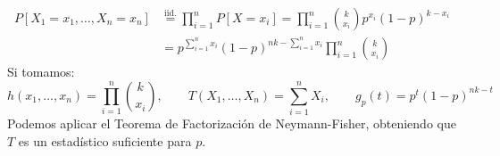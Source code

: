 \begin{ejercicio}
\begin{enumerate}[label=\alph*)]
            \begin{align*}
                P[X_1=x_1, \ldots, X_n = x_n] &\stackrel{\text{iid.}}{=} \prod_{i=1}^{n} P[X=x_i] = \prod_{i=1}^{n} \binom{k}{x_i} p^{x_i} {(1-p)}^{k-x_i} \\
                                              &= p^{\sum\limits_{i=1}^n x_i} {(1-p)}^{nk - \sum\limits_{i=1}^n x_i} \prod_{i=1}^{n} \binom{k}{x_i} 
            \end{align*}
            Si tomamos:
            \begin{equation*}
                h(x_1, \ldots, x_n) = \prod_{i=1}^{n}\binom{k}{x_i}, \qquad 
                T(X_1, \ldots, X_n) = \sum_{i=1}^{n} X_i, \qquad 
                g_p(t) = p^t {(1-p)}^{nk - t}
            \end{equation*}
            Podemos aplicar el Teorema de Factorización de Neymann-Fisher, obteniendo que $T$ es un estadístico suficiente para $p$.
    \end{enumerate}
\end{ejercicio}

